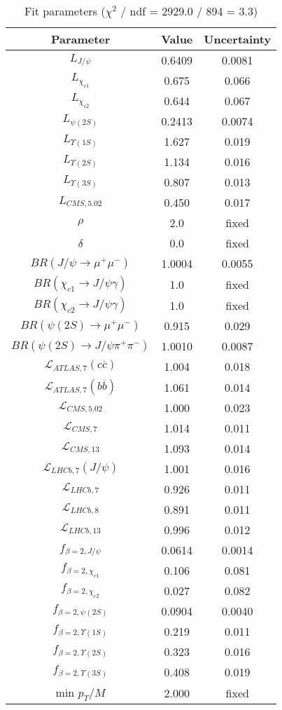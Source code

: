\begin{table}[h!]
\centering
\begin{tabular}{c|c|c}
Parameter & Value & Uncertainty \\
\hline
$L_{J/\psi}$ & 0.6409 & 0.0081 \\
$L_{\chi_{c1}}$ & 0.675 & 0.066 \\
$L_{\chi_{c2}}$ & 0.644 & 0.067 \\
$L_{\psi(2S)}$ & 0.2413 & 0.0074 \\
$L_{\Upsilon(1S)}$ & 1.627 & 0.019 \\
$L_{\Upsilon(2S)}$ & 1.134 & 0.016 \\
$L_{\Upsilon(3S)}$ & 0.807 & 0.013 \\
$L_{CMS,5.02}$ & 0.450 & 0.017 \\
$\rho$ & 2.0 & fixed \\
$\delta$ & 0.0 & fixed \\
$BR(J/\psi\rightarrow\mu^+\mu^-)$ & 1.0004 & 0.0055 \\
$BR(\chi_{c1}\rightarrow J/\psi\gamma)$ & 1.0 & fixed \\
$BR(\chi_{c2}\rightarrow J/\psi\gamma)$ & 1.0 & fixed \\
$BR(\psi(2S)\rightarrow\mu^+\mu^-)$ & 0.915 & 0.029 \\
$BR(\psi(2S)\rightarrow J/\psi\pi^+\pi^-)$ & 1.0010 & 0.0087 \\
$\mathcal L_{ATLAS,7}(c\overline c)$ & 1.004 & 0.018 \\
$\mathcal L_{ATLAS,7}(b\overline b)$ & 1.061 & 0.014 \\
$\mathcal L_{CMS,5.02}$ & 1.000 & 0.023 \\
$\mathcal L_{CMS,7}$ & 1.014 & 0.011 \\
$\mathcal L_{CMS,13}$ & 1.093 & 0.014 \\
$\mathcal L_{LHCb,7}(J/\psi)$ & 1.001 & 0.016 \\
$\mathcal L_{LHCb,7}$ & 0.926 & 0.011 \\
$\mathcal L_{LHCb,8}$ & 0.891 & 0.011 \\
$\mathcal L_{LHCb,13}$ & 0.996 & 0.012 \\
$f_{\beta=2,J/\psi}$ & 0.0614 & 0.0014 \\
$f_{\beta=2,\chi_{c1}}$ & 0.106 & 0.081 \\
$f_{\beta=2,\chi_{c2}}$ & 0.027 & 0.082 \\
$f_{\beta=2,\psi(2S)}$ & 0.0904 & 0.0040 \\
$f_{\beta=2,\Upsilon(1S)}$ & 0.219 & 0.011 \\
$f_{\beta=2,\Upsilon(2S)}$ & 0.323 & 0.016 \\
$f_{\beta=2,\Upsilon(3S)}$ & 0.408 & 0.019 \\
min $p_T/M$ & 2.000 & fixed \\
\end{tabular}
\caption{Fit parameters ($\chi^2$ / ndf = 2929.0 / 894 = 3.3)}
\end{table}
